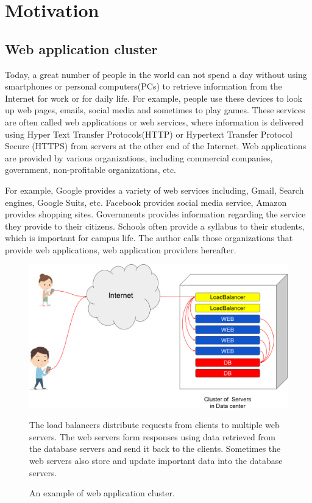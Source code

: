 
\section{Motivation}

\subsection{Web application cluster}

Today, a great number of people in the world can not spend a day without using smartphones or personal computers(PCs) to retrieve information from the Internet for work or for daily life.
For example, people use these devices to look up web pages, emails, social media and sometimes to play games.
These services are often called web applications or web services, where information is delivered using Hyper Text Transfer Protocols(HTTP) or Hypertext Transfer Protocol Secure (HTTPS) from servers at the other end of the Internet.
Web applications are provided by various organizations, including commercial companies, government, non-profitable organizations, etc.

For example, Google provides a variety of web services including, Gmail, Search engines, Google Suits, etc.
Facebook provides social media service, Amazon provides shopping sites.
Governments provides information regarding the service they provide to their citizens.
Schools often provide a syllabus to their students, which is important for campus life.
The author calls those organizations that provide web applications, web application providers hereafter.

\begin{figure}[h]
\begin{center}
\includegraphics[width=0.8\columnwidth]{Figs/web_cluster.png}
\end{center}
\caption{
An example of web application cluster.
}
\centering\parbox[c]{0.9\columnwidth}{
The load balancers distribute requests from clients to multiple web servers.
The web servers form responses using data retrieved from the database servers and send it back to the clients.
Sometimes the web servers also store and update important data into the database servers.
}
\label{fig:web_cluster}
\end{figure}


